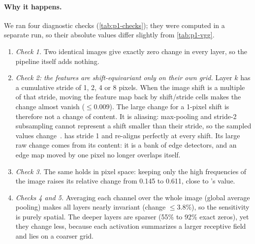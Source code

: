 \paragraph{Why it happens.}
We ran four diagnostic checks (\cref{tab:p1-checks}); they were computed in a separate run, so their absolute values differ slightly from \cref{tab:p1-vgg}.
\begin{enumerate}[nosep,leftmargin=*]
  \item \emph{Check 1.} Two identical images give exactly zero change in every layer, so the pipeline itself adds nothing.
  \item \emph{Check 2: the features are shift-equivariant only on their own grid.}
  Layer $k$ has a cumulative stride of 1, 2, 4 or 8 pixels.
  When the image shift is a multiple of that stride, moving the feature map back by shift/stride cells makes the change almost vanish ($\le0.009$).
  The large change for a 1-pixel shift is therefore not a change of content.
  It is aliasing: max-pooling and stride-2 subsampling cannot represent a shift smaller than their stride, so the sampled values change~\cite{zhang2019blurpool}.
   has stride 1 and re-aligns perfectly at every shift.
  Its large raw change comes from its content: it is a bank of edge detectors, and an edge map moved by one pixel no longer overlaps itself.
  \item \emph{Check 3.} The same holds in pixel space: keeping only the high frequencies of the image raises its relative change from 0.145 to 0.611, close to 's value.
  \item \emph{Checks 4 and 5.} Averaging each channel over the whole image (global average pooling) makes all layers nearly invariant (change $\le3.8\%$), so the sensitivity is purely spatial.
  The deeper layers are sparser (55\% to 92\% exact zeros), yet they change less, because each activation summarizes a larger receptive field and lies on a coarser grid.
\end{enumerate}

